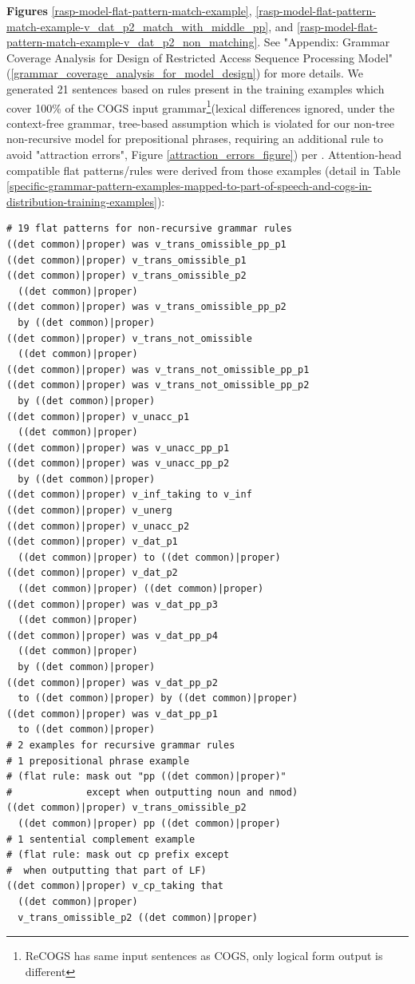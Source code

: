 \documentclass[11pt]{article}
\begin{document}
\textbf{Figures} \ref{rasp-model-flat-pattern-match-example}, \ref{rasp-model-flat-pattern-match-example-v_dat_p2_match_with_middle_pp}, and \ref{rasp-model-flat-pattern-match-example-v_dat_p2_non_matching}. See "Appendix: Grammar Coverage Analysis for Design of Restricted Access Sequence Processing Model" (\ref{grammar_coverage_analysis_for_model_design}) for more details. We generated 21 sentences based on rules present in the training examples which cover 100\% of the COGS input grammar\footnote{ReCOGS has same input sentences as COGS, only logical form output is different}(lexical differences ignored, under the context-free grammar, tree-based assumption which is violated for our non-tree non-recursive model for prepositional phrases, requiring an additional rule to avoid "attraction errors", Figure \ref{attraction_errors_figure}) per \citep{fuzzingbook2023:GrammarCoverageFuzzer}.
Attention-head compatible flat patterns/rules were derived from those examples (detail in Table \ref{specific-grammar-pattern-examples-mapped-to-part-of-speech-and-cogs-in-distribution-training-examples}):
\begin{tiny}
\begin{verbatim}
# 19 flat patterns for non-recursive grammar rules
((det common)|proper) was v_trans_omissible_pp_p1
((det common)|proper) v_trans_omissible_p1
((det common)|proper) v_trans_omissible_p2 
  ((det common)|proper)
((det common)|proper) was v_trans_omissible_pp_p2 
  by ((det common)|proper)
((det common)|proper) v_trans_not_omissible 
  ((det common)|proper)
((det common)|proper) was v_trans_not_omissible_pp_p1
((det common)|proper) was v_trans_not_omissible_pp_p2 
  by ((det common)|proper)
((det common)|proper) v_unacc_p1 
  ((det common)|proper)
((det common)|proper) was v_unacc_pp_p1
((det common)|proper) was v_unacc_pp_p2
  by ((det common)|proper)
((det common)|proper) v_inf_taking to v_inf
((det common)|proper) v_unerg
((det common)|proper) v_unacc_p2
((det common)|proper) v_dat_p1 
  ((det common)|proper) to ((det common)|proper)
((det common)|proper) v_dat_p2 
  ((det common)|proper) ((det common)|proper)
((det common)|proper) was v_dat_pp_p3
  ((det common)|proper)
((det common)|proper) was v_dat_pp_p4
  ((det common)|proper) 
  by ((det common)|proper)
((det common)|proper) was v_dat_pp_p2 
  to ((det common)|proper) by ((det common)|proper)
((det common)|proper) was v_dat_pp_p1
  to ((det common)|proper)
# 2 examples for recursive grammar rules
# 1 prepositional phrase example
# (flat rule: mask out "pp ((det common)|proper)" 
#             except when outputting noun and nmod)
((det common)|proper) v_trans_omissible_p2 
  ((det common)|proper) pp ((det common)|proper)
# 1 sentential complement example
# (flat rule: mask out cp prefix except 
#  when outputting that part of LF)
((det common)|proper) v_cp_taking that 
  ((det common)|proper) 
  v_trans_omissible_p2 ((det common)|proper)
\end{verbatim}
\end{tiny}
\end{document}

